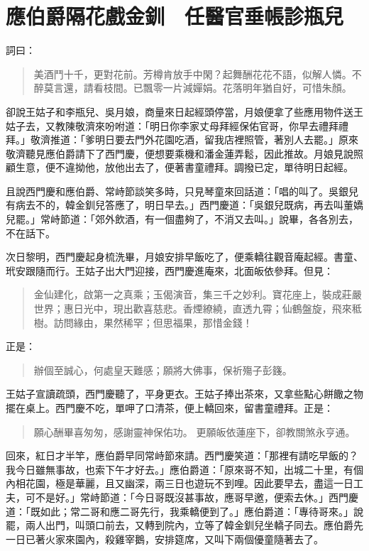 
\chapter{應伯爵隔花戲金釧　任醫官垂帳診瓶兒}

詞曰：
\begin{quote}
美酒鬥十千，更對花前。芳樽肯放手中閑？起舞酬花花不語，似解人憐。不醉莫言還，請看枝間。已飄零一片減嬋娟。花落明年猶自好，可惜朱顏。
\end{quote}

卻說王姑子和李瓶兒、吳月娘，商量來日起經頭停當，月娘便拿了些應用物件送王姑子去，又教陳敬濟來吩咐道：「明日你李家丈母拜經保佑官哥，你早去禮拜禮拜。」敬濟推道：「爹明日要去門外花園吃酒，留我店裡照管，著別人去罷。」原來敬濟聽見應伯爵請下了西門慶，便想要乘機和潘金蓮弄鬆，因此推故。月娘見說照顧生意，便不違拗他，放他出去了，便著書童禮拜。調撥已定，單待明日起經。

且說西門慶和應伯爵、常峙節談笑多時，只見琴童來回話道：「唱的叫了。吳銀兒有病去不的，韓金釧兒答應了，明日早去。」西門慶道：「吳銀兒既病，再去叫董嬌兒罷。」常峙節道：「郊外飲酒，有一個盡夠了，不消又去叫。」說畢，各各別去，不在話下。

次日黎明，西門慶起身梳洗畢，月娘安排早飯吃了，便乘轎往觀音庵起經。書童、玳安跟隨而行。王姑子出大門迎接，西門慶進庵來，北面皈依參拜。但見：
\begin{quote}
金仙建化，啟第一之真乘；玉偈演音，集三千之妙利。寶花座上，裝成莊嚴世界；惠日光中，現出歡喜慈悲。香煙繚繞，直透九霄；仙鶴盤旋，飛來秪樹。訪問緣由，果然稀罕；但思福果，那惜金錢！
\end{quote}
正是：
\begin{quote}
辦個至誠心，何處皇天難感；願將大佛事，保祈殤子彭籛。
\end{quote}

王姑子宣讀疏頭，西門慶聽了，平身更衣。王姑子捧出茶來，又拿些點心餅饊之物擺在桌上。西門慶不吃，單呷了口清茶，便上轎回來，留書童禮拜。正是：
\begin{quote}
願心酬畢喜匆匆，感謝靈神保佑功。
更願皈依蓮座下，卻教關煞永亨通。
\end{quote}

回來，紅日才半竿，應伯爵早同常峙節來請。西門慶笑道：「那裡有請吃早飯的？我今日雖無事故，也索下午才好去。」應伯爵道：「原來哥不知，出城二十里，有個內相花園，極是華麗，且又幽深，兩三日也遊玩不到哩。因此要早去，盡這一日工夫，可不是好。」常峙節道：「今日哥既沒甚事故，應哥早邀，便索去休。」西門慶道：「既如此；常二哥和應二哥先行，我乘轎便到了。」應伯爵道：「專待哥來。」說罷，兩人出門，叫頭口前去，又轉到院內，立等了韓金釧兒坐轎子同去。應伯爵先一日已著火家來園內，殺雞宰鵝，安排筵席，又叫下兩個優童隨著去了。

